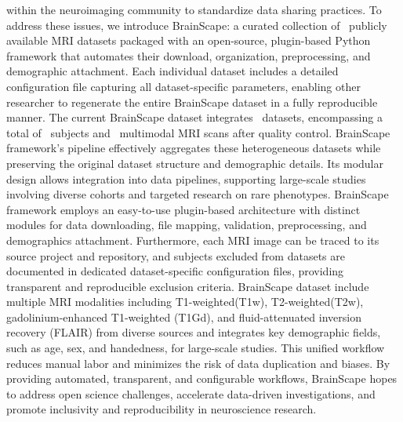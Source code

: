 within the neuroimaging community to standardize data sharing practices. 
To address these issues, we introduce BrainScape: a curated collection of \NumDatasets\ publicly available MRI datasets 
packaged with an open-source, plugin-based Python framework that automates their download, organization, preprocessing, and demographic attachment. 
Each individual dataset includes a detailed configuration file capturing all dataset-specific parameters, 
enabling other researcher to regenerate the entire BrainScape dataset in a fully reproducible manner. 
The current BrainScape dataset integrates \NumDatasets\ datasets,
encompassing a total of \TotalSubjectsIncludedAfterInspectionCount\ subjects and \TotalNumMRIs\ multimodal MRI scans after quality control. 
BrainScape framework's pipeline effectively aggregates these heterogeneous datasets while preserving the original dataset structure and demographic details.
Its modular design allows integration into data pipelines, supporting large-scale studies involving diverse cohorts and targeted research on rare phenotypes. 
BrainScape framework employs an easy-to-use plugin-based architecture with distinct modules for data downloading, file mapping, validation, preprocessing, and demographics attachment. 
Furthermore, each MRI image can be traced to its source project and repository, and subjects excluded from datasets are documented in dedicated dataset-specific configuration files, 
providing transparent and reproducible exclusion criteria.
BrainScape dataset include multiple MRI modalities including T1-weighted(T1w), T2-weighted(T2w), 
gadolinium-enhanced T1-weighted (T1Gd), and fluid-attenuated inversion recovery (FLAIR) from diverse sources 
and integrates key demographic fields, such as age, sex, and handedness, for large-scale studies.
This unified workflow reduces manual labor and minimizes the risk of data duplication and biases. 
By providing automated, transparent, and configurable workflows, 
BrainScape hopes to address open science challenges, accelerate data-driven investigations, 
and promote inclusivity and reproducibility in neuroscience research. 
